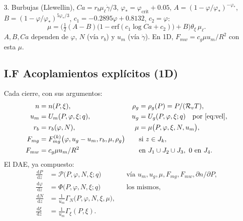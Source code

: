 \documentclass[11pt,a4paper]{article}
\newcommand{\dd}{\,\mathrm{d}}
\newcommand{\p}{\partial}
\newcommand{\Rv}{\mathcal{R}_v}
\begin{document}
3. Burbujas (Llewellin), $Ca=r_b\mu_\ell\dot\gamma/3$,
$\varphi_\ast=\varphi_{\mathrm{crit}}+0.05$,
$A=(1-\varphi/\varphi_\ast)^{-\varphi_\ast}$,
$B=(1-\varphi/\varphi_\ast)^{5\varphi_\ast/3}$,
$c_1=-0.2895\varphi+0.8132$, $c_2=\varphi$:
\begin{equation}
\label{eq:mu}
\mu
=\Biggl(\tfrac12(A-B)\bigl(1-\mathrm{erf}(c_1\log Ca+c_2)\bigr)+B\Biggr)
\theta_\xi\,\mu_\ell.
\end{equation}
$A,B,Ca$ dependen de $\varphi$, $N$ (vía $r_b$) y $u_m$ (vía
$\dot\gamma$). En 1D, $F_{mw}=c_g\mu u_m/R^2$ con esta $\mu$.

\subsection*{I.F Acoplamientos explícitos (1D)}

Cada cierre, con sus argumentos:
\begin{equation}
\label{eq:acop}
\begin{aligned}
n&=n(P,\xi),
&
\rho_g&=\rho_g(P)=P/(\Rv T),
\\
u_m&=U_m(P,\varphi,\xi;q),
&
u_g&=U_g(P,\varphi,\xi;q)
\quad\text{por~\eqref{eq:vel}},
\\
r_b&=r_b(\varphi,N),
&
\mu&=\mu\bigl(P,\varphi,\xi,N,u_m\bigr),
\\
F_{mg}&=F_{mg}^{(k)}\bigl(\varphi,u_g-u_m,r_b,\mu,\rho_g\bigr)
&
&\text{si }z\in J_k,
\\
F_{mw}&=c_g\mu u_m/R^2
&
&\text{en }J_1\cup J_2\cup J_3,\ 0\text{ en }J_4.
\end{aligned}
\end{equation}
El DAE, ya compuesto:
\begin{equation}
\label{eq:dae-acop}
\begin{aligned}
\frac{\dd P}{\dd z}
&=\mathcal{P}\bigl(P,\varphi,N,\xi;q\bigr)
&&\text{vía }u_m,u_g,\mu,F_{mg},F_{mw},\p n/\p P,
\\
\frac{\dd\varphi}{\dd z}
&=\Phi\bigl(P,\varphi,N,\xi;q\bigr)
&&\text{los mismos},
\\
\frac{\dd N}{\dd z}
&=\frac{1}{u_m}\Gamma_N\bigl(P,\varphi,N,\xi,\mu\bigr),
\\
\frac{\dd\xi}{\dd z}
&=\frac{1}{u_m}\Gamma_\xi(P,\xi).
\end{aligned}
\end{equation}
\end{document}
